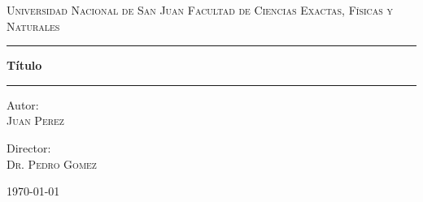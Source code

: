 \begin{titlepage}
\center %

\textsc{\LARGE Universidad Nacional de San Juan}
\vspace{1cm}
\textsc{\Large Facultad de Ciencias Exactas, Físicas y Naturales}
\vspace{1cm}
\rule{\linewidth}{0.5mm}
\vspace{0.5cm}
\textbf{\huge Título}
\rule{\linewidth}{0.5mm}
\vspace{1.8cm}

\begin{minipage}{0.4\textwidth}
\large
\begin{flushleft}
Autor:\\
\textsc{Juan Perez}
\end{flushleft}
\end{minipage}
\begin{minipage}{0.4\textwidth}
\large
\begin{flushright}
Director:\\
\textsc{Dr. Pedro Gomez}
\end{flushright}
\end{minipage}

\vspace{\fill}
{\large \today{}}
\end{titlepage}

\clearpage{} %
\thispagestyle{empty} %

